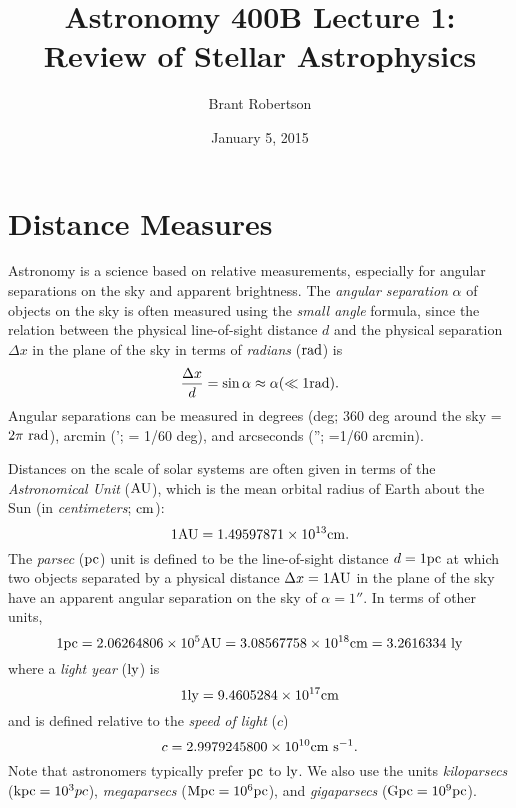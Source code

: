\documentclass[12pt]{article}
\title{Astronomy 400B Lecture 1: Review of Stellar Astrophysics}
\author{Brant Robertson}
\date{January 5, 2015}
\begin{document}
\maketitle

\section{Distance Measures}

Astronomy is a science based on relative measurements, 
especially for angular separations on the sky and apparent brightness.
The {\it angular separation} $\alpha$ of objects on the sky
is often measured
using the {\it small angle} formula, since the relation between
the physical line-of-sight distance $d$ and the physical separation 
$\Delta x$ in the plane of the sky in terms of {\it radians} ($\mathrm{rad}$) is
\begin{equation}
\label{eqn:small_angle}
\frac{\Delta x}{d} = \sin \alpha \approx \alpha (\ll 1 \mathrm{rad}).
\end{equation}
Angular separations can be measured in degrees (deg; 360 deg around the sky = $2\pi~\mathrm{rad}$), 
arcmin ('; = 1/60 deg),
and arcseconds (''; =1/60 arcmin).

Distances on the scale of solar systems are often given in terms
of the {\it Astronomical Unit} ($\mathrm{AU}$), which is the mean orbital
radius of Earth about the Sun (in {\it centimeters}; $\mathrm{cm}$):
\begin{equation}
\label{eqn:AU}
1 \mathrm{AU} = 1.49597871 \times 10^{13} \mathrm{cm}.
\end{equation}
\noindent
The {\it parsec} ($\mathrm{pc}$) unit is defined to be the line-of-sight distance $d=1 \mathrm{pc}$
at which two objects separated by a physical distance $\Delta x=1\mathrm{AU}$ in the
plane of the sky have an apparent angular separation on the sky of $\alpha=1''$.
In terms of other units,
\begin{equation}
\label{eqn:parsec}
1\mathrm{pc} = 2.06264806 \times 10^{5} \mathrm{AU} = 3.08567758 \times 10^{18} \mathrm{cm} = 3.2616334~\mathrm{ly}
\end{equation}
\noindent
where a {\it light year} ($\mathrm{ly}$) is
\begin{equation}
1\mathrm{ly} = 9.4605284\times10^{17}\mathrm{cm}
\end{equation}
\noindent
and is defined relative to the {\it speed of light} ($c$)
\begin{equation}
\label{eqn:speed_of_light}
c = 2.9979245800\times10^{10} \mathrm{cm}~\mathrm{s}^{-1}.
\end{equation}
\noindent
Note that astronomers typically prefer $\mathrm{pc}$ to $\mathrm{ly}$. We also
use the units {\it kiloparsecs} ($\mathrm{kpc} = 10^{3}pc$), 
{\it megaparsecs} ($\mathrm{Mpc} = 10^6 \mathrm{pc}$), and {\it gigaparsecs}
($\mathrm{Gpc} = 10^9 \mathrm{pc}$).
\end{document}
